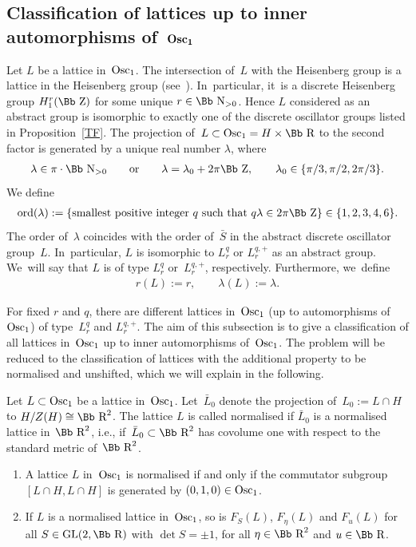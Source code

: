 \documentclass[pdftex]{sigma}
\newcommand\RR{{\mbox{\Bb R}}}
\newcommand\NN{{\mbox{\Bb N}}}
\newcommand\ZZ{{\mbox{\Bb Z}}}
\newcommand{\GL}{\mathop{{\rm GL}}}
\newcommand{\Osc}{{\rm Osc}}
\newcommand{\ord}{{\rm ord}}
\newcommand{\benur}{\begin{enumerate}[label=$(\roman*)$]\itemsep=0pt}
\numberwithin{equation}{section}
\begin{document}
\subsection[Classification of lattices up to inner automorphisms of~$\Osc_1$]
{Classification of lattices up to inner automorphisms of~$\boldsymbol{\Osc_1}$}
\label{S42}
Let $L$ be a lattice in~$\Osc_1$. The intersection of~$L$ with the Heisenberg group is a lattice in the Heisenberg group (see~\cite[Corollary~3.5]{Ra72}). In~particular, it~is a discrete Heisenberg group $H_1^r(\ZZ)$ for some unique $r\in\NN_{>0}$. Hence $L$ considered as an abstract group is isomorphic to exactly one of the discrete oscillator groups listed in Proposition~\ref{TF}.
The projection of~$L\subset\Osc_1=H\times\RR$ to the second factor is generated by a unique real number $\lambda$, where
\begin{gather*}
\lambda\in \pi\cdot \NN_{>0}\qquad \text{or}\qquad \lambda= \lambda_0+2\pi\ZZ,\qquad \lambda_0\in \{\pi/3, \pi/2, 2\pi/3\}.
\end{gather*}
We define
\begin{gather*}
\ord(\lambda):=\{\text{smallest positive integer $q$ such that } q\lambda\in 2\pi\ZZ\}
\in\{1,2,3,4,6\}.
\end{gather*}
The order of~$\lambda$ coincides with the order of~$\bar S$ in the abstract discrete oscillator group~$L$. In~particular, $L$ is isomorphic to $L^q_r$ or $L^{q,+}_r$ as an abstract group. We~will say that $L$ is of type $L^q_r$ or~$L^{q,+}_r$, respectively. Furthermore, we~define
\begin{gather}\label{Drlambda}
r(L):=r,\qquad\lambda(L):=\lambda.
\end{gather}

For fixed $r$ and $q$, there are different lattices in~$\Osc_1$ (up to automorphisms of~$\Osc_1$) of type~$L^q_r$ and $L^{q,+}_r$. The aim of this subsection is to give a classification of all lattices in~$\Osc_1$ up to inner automorphisms of~$\Osc_1$. The problem will be reduced to the classification of lattices with the additional property to be normalised and unshifted, which we will explain in the following.
%
\begin{Definition} Let $L\subset \Osc_1$ be a lattice in~$\Osc_1$. Let~$\bar L_0$ denote the projection of~$L_0:=L\cap H$ to $H/Z(H)\cong \RR^2$. The lattice $L$ is called normalised if $\bar L_0$ is a normalised lattice in~$\RR^2$, i.e., if~$\bar L_0\subset \RR^2$ has covolume one with respect to the standard metric of~$\RR^2$.
\end{Definition}
\begin{Remark}\quad
\benur
\item A lattice $L$ in~$\Osc_1$ is normalised if and only if the commutator subgroup $[L\cap H,L\cap H]$ is generated by $(0,1,0)\in\Osc_1$.
\item
If $L$ is a normalised lattice in~$\Osc_1$, so is $F_S(L)$, $F_\eta(L)$ and $F_u(L)$ for all $S\in\GL(2,\RR)$ with $\det S=\pm 1$, for all $\eta\in \RR^2$ and $u\in\RR$.
\end{enumerate}
\end{Remark}
\end{document}

